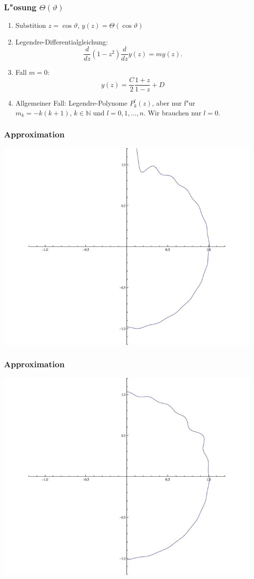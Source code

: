 \documentclass[handout]{beamer}
\begin{document}
\begin{frame}
\frametitle{L"osung $\Theta(\vartheta)$}
\begin{enumerate}
\item Substition $z=\cos\vartheta$, $y(z)=\Theta(\cos\vartheta)$
\item Legendre-Differentialgleichung:
\[
\frac{d}{dz}(1-z^2)\frac{d}{dz}y(z) =my(z).
\]
\item Fall $m=0$:
\[
y(z)=\frac{C}2\frac{1+z}{1-z}+D
\]
\item Allgemeiner Fall: Legendre-Polynome $P_k^l(z)$, aber nur
f"ur $m_k=-k(k+1)$, $k\in\mathbb N$ und $l=0,1,\dots,n$.
Wir brauchen nur $l=0$.
\end{enumerate}
\end{frame}

\begin{frame}
\frametitle{Approximation}
\begin{center}
\includegraphics[width=0.9\hsize]{../../skript/graphics/tsunami0.jpg}
\end{center}
\end{frame}

\begin{frame}
\frametitle{Approximation}
\begin{center}
\includegraphics[width=0.9\hsize]{../../skript/graphics/tsunami50.jpg}
\end{center}
\end{frame}
\end{document}
